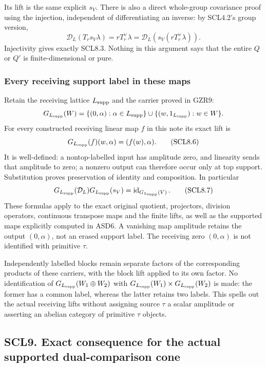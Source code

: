 Its lift is the same explicit \(s_V\). There is also a direct
whole-group covariance proof using the injection, independent of
differentiating an inverse: by SCL4.2's group version, \[
 \mathcal D_L(T_rs_V\lambda)
 =rT_r^\vee\lambda
 =\mathcal D_L(s_V(rT_r^\vee\lambda)).
\] Injectivity gives exactly SCL8.3. Nothing in this argument says that
the entire \(Q\) or \(Q'\) is finite-dimensional or pure.

\subsubsection{Every receiving support label in these
maps}\label{every-receiving-support-label-in-these-maps}

Retain the receiving lattice \(L_{\rm supp}\) and the carrier proved in
GZR9: \[
 G_{L_{\rm supp}}(W)
 =\{(0,\alpha):\alpha\in L_{\rm supp}\}
   \cup\{(w,1_{L_{\rm supp}}):w\in W\}.
\] For every constructed receiving linear map \(f\) in this note its
exact lift is \[
 G_{L_{\rm supp}}(f)(w,\alpha)=(f(w),\alpha).
 \tag{SCL8.6}
\] It is well-defined: a nontop-labelled input has amplitude zero, and
linearity sends that amplitude to zero; a nonzero output can therefore
occur only at top support. Substitution proves preservation of identity
and composition. In particular \[
 G_{L_{\rm supp}}(\mathcal D_L)
 G_{L_{\rm supp}}(s_V)=\operatorname{id}_{G_{L_{\rm supp}}(V)}.
 \tag{SCL8.7}
\] These formulas apply to the exact original quotient, projectors,
division operators, continuous transpose maps and the finite lifts, as
well as the supported maps explicitly computed in ASD6. A vanishing map
amplitude retains the output \((0,\alpha)\), not an erased support
label. The receiving zero \((0,\alpha)\) is not identified with
primitive \(\tau\).

Independently labelled blocks remain separate factors of the
corresponding products of these carriers, with the block lift applied to
its own factor. No identification of \(G_{L_{\rm supp}}(W_1\oplus W_2)\)
with \(G_{L_{\rm supp}}(W_1)\times G_{L_{\rm supp}}(W_2)\) is made: the
former has a common label, whereas the latter retains two labels. This
spells out the actual receiving lifts without assigning source \(\tau\)
a scalar amplitude or asserting an abelian category of primitive
\(\tau\) objects.

\subsection{SCL9. Exact consequence for the actual supported
dual-comparison
cone}\label{scl9.-exact-consequence-for-the-actual-supported-dual-comparison-cone}

